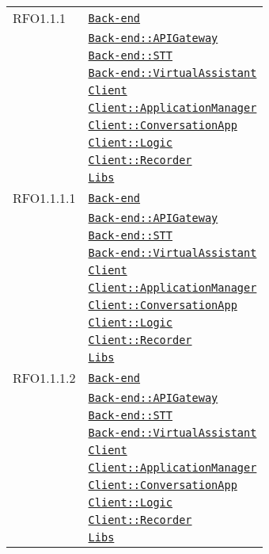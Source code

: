 \begin{longtable}{|>{\centering}m{3cm}|m{10cm}<{\centering}|}
RFO1.1.1 & \hyperref[Back-end]{\texttt{Back-end}}\\
& \hyperref[Back-end::APIGateway]{\texttt{Back-end::APIGateway}}\\
& \hyperref[Back-end::STT]{\texttt{Back-end::STT}}\\
& \hyperref[Back-end::VirtualAssistant]{\texttt{Back-end::VirtualAssistant}}\\
& \hyperref[Client]{\texttt{Client}}\\
& \hyperref[Client::ApplicationManager]{\texttt{Client::ApplicationManager}}\\
& \hyperref[Client::ConversationApp]{\texttt{Client::ConversationApp}}\\
& \hyperref[Client::Logic]{\texttt{Client::Logic}}\\
& \hyperref[Client::Recorder]{\texttt{Client::Recorder}}\\
& \hyperref[Libs]{\texttt{Libs}}\\ \hline

RFO1.1.1.1 & \hyperref[Back-end]{\texttt{Back-end}}\\
& \hyperref[Back-end::APIGateway]{\texttt{Back-end::APIGateway}}\\
& \hyperref[Back-end::STT]{\texttt{Back-end::STT}}\\
& \hyperref[Back-end::VirtualAssistant]{\texttt{Back-end::VirtualAssistant}}\\
& \hyperref[Client]{\texttt{Client}}\\
& \hyperref[Client::ApplicationManager]{\texttt{Client::ApplicationManager}}\\
& \hyperref[Client::ConversationApp]{\texttt{Client::ConversationApp}}\\
& \hyperref[Client::Logic]{\texttt{Client::Logic}}\\
& \hyperref[Client::Recorder]{\texttt{Client::Recorder}}\\
& \hyperref[Libs]{\texttt{Libs}}\\ \hline

RFO1.1.1.2 & \hyperref[Back-end]{\texttt{Back-end}}\\
& \hyperref[Back-end::APIGateway]{\texttt{Back-end::APIGateway}}\\
& \hyperref[Back-end::STT]{\texttt{Back-end::STT}}\\
& \hyperref[Back-end::VirtualAssistant]{\texttt{Back-end::VirtualAssistant}}\\
& \hyperref[Client]{\texttt{Client}}\\
& \hyperref[Client::ApplicationManager]{\texttt{Client::ApplicationManager}}\\
& \hyperref[Client::ConversationApp]{\texttt{Client::ConversationApp}}\\
& \hyperref[Client::Logic]{\texttt{Client::Logic}}\\
& \hyperref[Client::Recorder]{\texttt{Client::Recorder}}\\
& \hyperref[Libs]{\texttt{Libs}}\\ \hline


\end{longtable}
